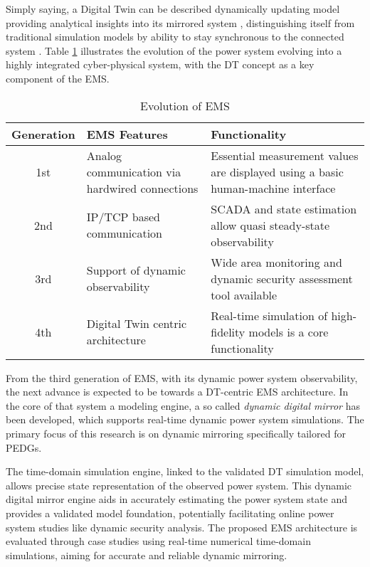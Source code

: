 
Simply saying, a Digital Twin can be described dynamically updating model providing analytical insights into its mirrored system , distinguishing itself from traditional simulation models by ability to stay synchronous to the connected system \autocite{Zomerdijk_2024}. Table \ref{tab:ems_evol} illustrates the evolution of the power system evolving into a highly integrated cyber-physical system, with the DT concept as a key component of the EMS.

\begin{table} [htbp]
    \centering
    \begin{threeparttable}%
        \caption{Evolution of EMS \autocite{8398846}}\label{tab:ems_evol}%
        \begin{tabular}{| c || p{5cm} | p{8cm} |}
            \hline
            \hline
                 \textbf{Generation} & \textbf{EMS Features} & \textbf{Functionality}\\ \hline
                1st & Analog communication via hardwired connections & Essential measurement values are displayed using a basic human-machine interface \\ \hline
                2nd & IP/TCP based  communication & SCADA and state estimation allow quasi steady-state observability \\ \hline
                3rd & Support of dynamic  observability & Wide area monitoring and dynamic security assessment tool available \\ \hline
                4th & Digital Twin centric architecture & Real-time simulation of high-fidelity models is a core functionality \\ \hline
            \hline
        \end{tabular}
    \end{threeparttable}
\end{table}

From the third generation of EMS, with its dynamic power system observability, the next advance is expected to be towards a DT-centric EMS architecture. In the core of that system a modeling engine, a so called \textit{dynamic digital mirror} has been developed, which supports real-time dynamic power system simulations. The primary focus of this research is on dynamic mirroring specifically tailored for PEDGs.

The time-domain simulation engine, linked to the validated DT simulation model, allows precise state representation of the observed power system. This dynamic digital mirror engine aids in accurately estimating the power system state and provides a validated model foundation, potentially facilitating online power system studies like dynamic security analysis. The proposed EMS architecture is evaluated through case studies using real-time numerical time-domain simulations, aiming for accurate and reliable dynamic mirroring.

